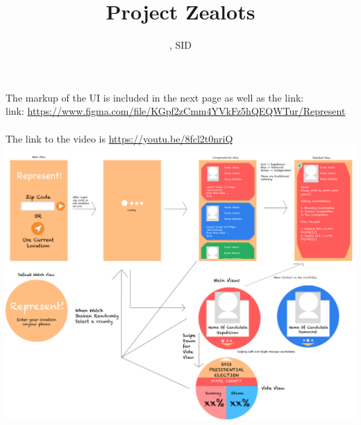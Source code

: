 \documentclass[11pt]{article}
\title{Project Zealots}
\author{\Name, SID \SID}
\date{}
\begin{document}
\maketitle
The markup of the UI is included in the next page as well as the link:\\
link: \url{https://www.figma.com/file/KGpf2zCmm4YVkFz5hQEQWTur/Represent}\\
\\
The link to the video is \url{https://youtu.be/8fcl2t0nriQ}\\
\newpage
\includegraphics[scale=0.37, angle=90]{Represent!.png}
\end{document}

